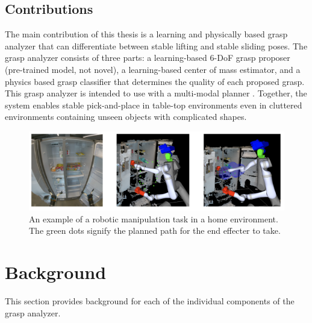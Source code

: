 \documentclass[12pt]{ucsddissertation}
\begin{document}
\section{Contributions}
The main contribution of this thesis is a learning and physically based grasp analyzer that can differentiate between stable lifting and stable sliding poses. The grasp analyzer consists of three parts: a learning-based 6-DoF grasp proposer (pre-trained model, not novel), a learning-based center of mass estimator, and a physics based grasp classifier that determines the quality of each proposed grasp. This grasp analyzer is intended to use with a multi-modal planner \cite{iRos2023}. Together, the system enables stable pick-and-place in table-top environments even in cluttered environments containing unseen objects with complicated shapes.

\begin{figure}
	\centering
	\includegraphics[width=\linewidth]{figures/exampleTask.png}
	\caption[An example of a pick-and-place task]{An example of a robotic manipulation task in a home environment. The green dots signify the planned path for the end effecter to take. \cite{Cheng_Shankar_Burdick_2020}}
	\label{fig:exampleTask}
\end{figure}

\chapter{Background}
This section provides background for each of the individual components of the grasp analyzer.
\end{document}
